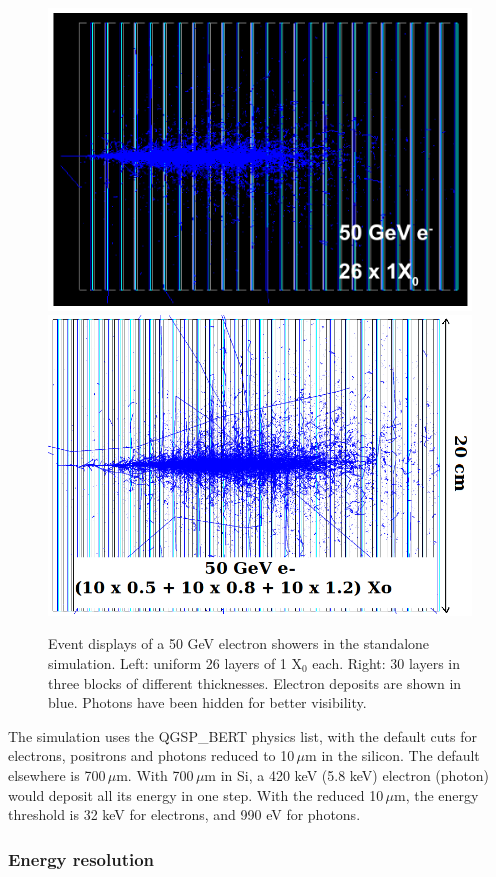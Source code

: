 \begin{figure}[h!]
  \begin{center}
    \includegraphics[width=\cmsFigWidth]{figures/e_50GeV_uniform_26x0.png}
    \includegraphics[width=\cmsFigWidth]{figures/e_50GeV_concept_v3.png}
    \caption{Event displays of a 50 GeV electron showers in the
      standalone simulation. Left: uniform 26 layers of 1 X$_0$
      each. Right: 30 layers in three blocks of different
      thicknesses. Electron deposits are shown in blue. Photons have
      been hidden for better visibility.}
    \label{fig:g4vis}
  \end{center}
\end{figure}

The simulation uses the QGSP\_BERT physics list, with the default cuts
for electrons, positrons and photons reduced to 10\,$\mu$m in the
silicon. The default elsewhere is 700\,$\mu$m. With 700\,$\mu$m in Si,
a 420 keV (5.8 keV) electron (photon) would deposit all its energy in
one step. With the reduced 10\,$\mu$m, the energy threshold is 32 keV
for electrons, and 990 eV for photons.



\subsubsection{Energy resolution}